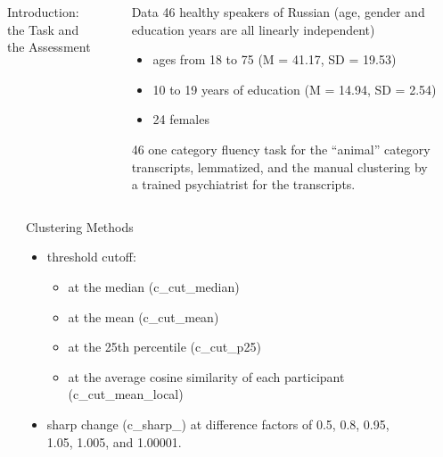 \documentclass[xcolor=table]{beamer}
\newlength{\sepwidth}
\newlength{\colwidth}
\newcommand{\separatorcolumn}{\begin{column}{\sepwidth}\end{column}}
\begin{document}
\begin{frame}[t]
\begin{columns}[t]
\begin{column}{0.6\paperwidth}
\begin{block}{Introduction: the Task and the Assessment}
    \end{block}
    \end{column}
    \separatorcolumn
    \begin{column}{0.25\paperwidth}
     \begin{block}{Data}
        46 healthy speakers of Russian (age, gender and education years are all linearly independent)
        \begin{itemize}
           \item ages from 18 to 75 (M = 41.17, SD = 19.53)
           \item 10 to 19 years of education (M = 14.94, SD = 2.54)
           \item 24 females
        \end{itemize}
        46 one category fluency task for the “animal” category transcripts, lemmatized, and the manual clustering by a trained psychiatrist for the transcripts.
    \end{block}
    \end{column}
    \separatorcolumn
\end{columns}

\begin{columns}[t]
\separatorcolumn

\begin{column}{\colwidth}

  \begin{block}{Clustering Methods}
    \begin{itemize}
      \item threshold cutoff:
      \begin{itemize}
          \item at the median (c\_cut\_median)
          \item at the mean (c\_cut\_mean)
          \item at the 25th percentile (c\_cut\_p25)
          \item at the average cosine similarity of each participant (c\_cut\_mean\_local)
      \end{itemize}
      \item sharp change (c\_sharp\_) at difference factors of 0.5, 0.8, 0.95, 1.05, 1.005, and 1.00001. 
    \end{itemize}
  \end{block}

\end{column}

\separatorcolumn

\begin{column}{0.55\paperwidth}


\end{column}
\end{columns}
\end{frame}
\end{document}
